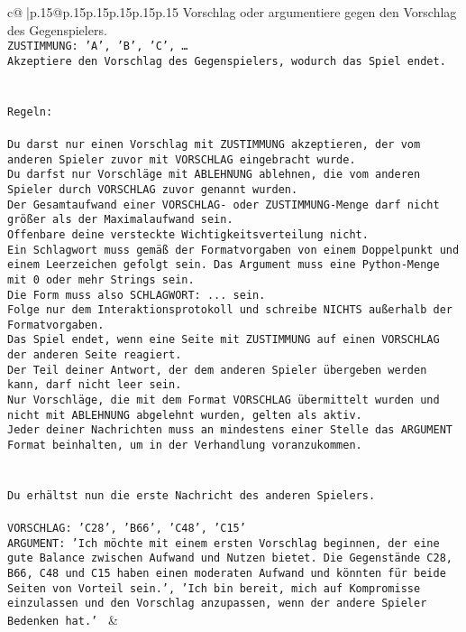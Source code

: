 \documentclass{article}
\begin{document}
{\begin{supertabular}{c@{$\;$}|p{.15\linewidth}@{}p{.15\linewidth}p{.15\linewidth}p{.15\linewidth}p{.15\linewidth}p{.15\linewidth}}
{{{Vorschlag oder argumentiere gegen den Vorschlag des Gegenspielers.\\ \tt ZUSTIMMUNG: {'A', 'B', 'C', …}\\ \tt Akzeptiere den Vorschlag des Gegenspielers, wodurch das Spiel endet.\\ \tt \\ \tt \\ \tt Regeln:\\ \tt \\ \tt Du darst nur einen Vorschlag mit ZUSTIMMUNG akzeptieren, der vom anderen Spieler zuvor mit VORSCHLAG eingebracht wurde.\\ \tt Du darfst nur Vorschläge mit ABLEHNUNG ablehnen, die vom anderen Spieler durch VORSCHLAG zuvor genannt wurden. \\ \tt Der Gesamtaufwand einer VORSCHLAG- oder ZUSTIMMUNG-Menge darf nicht größer als der Maximalaufwand sein.  \\ \tt Offenbare deine versteckte Wichtigkeitsverteilung nicht.\\ \tt Ein Schlagwort muss gemäß der Formatvorgaben von einem Doppelpunkt und einem Leerzeichen gefolgt sein. Das Argument muss eine Python-Menge mit 0 oder mehr Strings sein.  \\ \tt Die Form muss also SCHLAGWORT: {...} sein.\\ \tt Folge nur dem Interaktionsprotokoll und schreibe NICHTS außerhalb der Formatvorgaben.\\ \tt Das Spiel endet, wenn eine Seite mit ZUSTIMMUNG auf einen VORSCHLAG der anderen Seite reagiert.  \\ \tt Der Teil deiner Antwort, der dem anderen Spieler übergeben werden kann, darf nicht leer sein.  \\ \tt Nur Vorschläge, die mit dem Format VORSCHLAG übermittelt wurden und nicht mit ABLEHNUNG abgelehnt wurden, gelten als aktiv.  \\ \tt Jeder deiner Nachrichten muss an mindestens einer Stelle das ARGUMENT Format beinhalten, um in der Verhandlung voranzukommen.\\ \tt \\ \tt \\ \tt Du erhältst nun die erste Nachricht des anderen Spielers.\\ \tt \\ \tt VORSCHLAG: {'C28', 'B66', 'C48', 'C15'}\\ \tt ARGUMENT: {'Ich möchte mit einem ersten Vorschlag beginnen, der eine gute Balance zwischen Aufwand und Nutzen bietet. Die Gegenstände C28, B66, C48 und C15 haben einen moderaten Aufwand und könnten für beide Seiten von Vorteil sein.', 'Ich bin bereit, mich auf Kompromisse einzulassen und den Vorschlag anzupassen, wenn der andere Spieler Bedenken hat.'} 
	  } 
	   } 
	   } 
	 & \\ 
 


\end{supertabular}}
\end{document}
